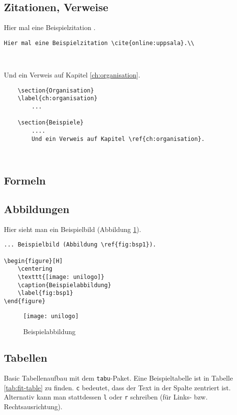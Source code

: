 \subsection{Zitationen, Verweise}
Hier mal eine Beispielzitation \cite{online:uppsala}.
\begin{verbatim}
Hier mal eine Beispielzitation \cite{online:uppsala}.\\
\end{verbatim}~

Und ein Verweis auf Kapitel \ref{ch:organisation}.
	\begin{verbatim}
	\section{Organisation}
	\label{ch:organisation}
	    ...
	
	\section{Beispiele}
	    ....
	    Und ein Verweis auf Kapitel \ref{ch:organisation}.
	\end{verbatim}~

\subsection{Formeln}


\subsection{Abbildungen}
Hier sieht man ein Beispielbild
(Abbildung \ref{fig:bsp1}).

\begin{verbatim}
... Beispielbild (Abbildung \ref{fig:bsp1}).

\begin{figure}[H]
    \centering
    \texttt{[image: unilogo]}
    \caption{Beispielabbildung}
    \label{fig:bsp1}
\end{figure}
\end{verbatim}

\begin{figure}[H]
\centering
\texttt{[image: unilogo]}
\caption{Beispielabbildung}
\label{fig:bsp1}
\end{figure}

\subsection{Tabellen}
Basic Tabellenaufbau mit dem \texttt{tabu}-Paket.
Eine Beispieltabelle ist in Tabelle \ref{tab:fit-table} zu finden.
\texttt{c} bedeutet, dass der Text in der Spalte zentriert ist.
Alternativ kann man stattdessen \texttt{l} oder \texttt{r} schreiben
(für Links- bzw. Rechtsausrichtung).

